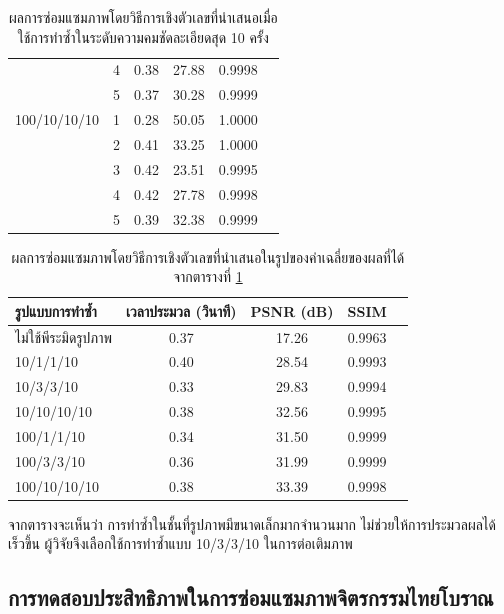 \begin{table}[H]
\begin{tabular}[ht]{|l|c|c|c|c|c|}
		& 4 & 0.38 & 27.88 & 0.9998\\
		& 5 & 0.37 & 30.28 & 0.9999 \\
		\hline
		100/10/10/10  & 1 & 0.28 & 50.05 &  1.0000\\
		& 2 & 0.41 & 33.25 &  1.0000\\
		& 3 & 0.42 & 23.51 & 0.9995 \\
		& 4 & 0.42 & 27.78 & 0.9998 \\
		& 5 & 0.39 & 32.38 & 0.9999 \\
		\hline
	\end{tabular}
	\caption{ผลการซ่อมแซมภาพโดยวิธีการเชิงตัวเลขที่นำเสนอเมื่อใช้การทำซ้ำในระดับความคมชัดละเอียดสุด 10 ครั้ง}
	\label{result:table-multiresolution2}
\end{table}	
\begin{table}[H]
    \centering
    \begin{tabular}[ht]{|l|c|c|c|c|}
        \hline
        รูปแบบการทำซ้ำ  & เวลาประมวล  (วินาที) & PSNR (dB) & SSIM \\
        \hline
        ไม่ใช้พีระมิดรูปภาพ & 0.37 & 17.26 & 0.9963  \\
        10/1/1/10 & 0.40 & 28.54 & 0.9993 \\
        10/3/3/10 & 0.33 & 29.83  & 0.9994 \\
        10/10/10/10 & 0.38 & 32.56 & 0.9995 \\
        100/1/1/10 & 0.34 & 31.50 & 0.9999 \\
        100/3/3/10 & 0.36 & 31.99 & 0.9999 \\
        100/10/10/10 & 0.38 & 33.39 & 0.9998 \\
        \hline
    \end{tabular}
    \caption{ผลการซ่อมแซมภาพโดยวิธีการเชิงตัวเลขที่นำเสนอในรูปของค่าเฉลี่ยของผลที่ได้จากตารางที่ \ref{result:table-multiresolution2}}
    \label{result:table-multiresolution2-summary}
\end{table}	

\hspace{1cm}จากตารางจะเห็นว่า การทำซ้ำในชั้นที่รูปภาพมีขนาดเล็กมากจำนวนมาก ไม่ช่วยให้การประมวลผลได้เร็วขึ้น ผู้วิจัยจึงเลือกใช้การทำซ้ำแบบ 10/3/3/10 ในการต่อเติมภาพ

\subsection{การทดสอบประสิทธิภาพในการซ่อมแซมภาพจิตรกรรมไทยโบราณ}

